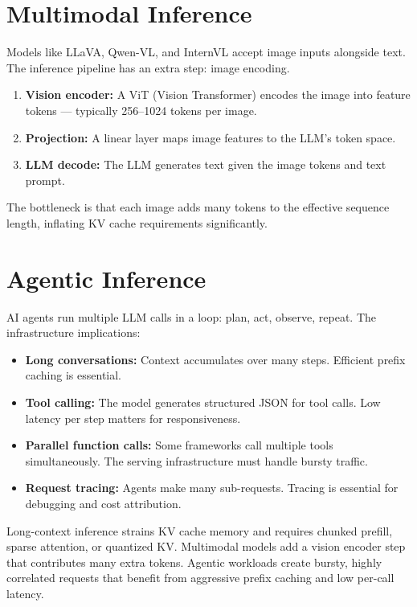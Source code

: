 \documentclass[11pt, twoside, openright]{book}
\newenvironment{chapsummary}
  {\begin{tcolorbox}[enhanced, breakable,
    colback={rgb,255:red,245;green,245;blue,225},
    colframe=AccentOrange, boxrule=1.5pt, arc=4pt,
    title={\bfseries Chapter Summary},
    fonttitle=\bfseries\color{white},
    attach boxed title to top left={yshift=-2mm, xshift=5mm},
    boxed title style={colback=AccentOrange, arc=2pt}]}
  {\end{tcolorbox}}
\begin{document}
\section{Multimodal Inference}

Models like LLaVA, Qwen-VL, and InternVL accept image inputs alongside text.
The inference pipeline has an extra step: image encoding.

\begin{enumerate}
  \item \textbf{Vision encoder:} A ViT (Vision Transformer) encodes the image
        into feature tokens --- typically 256--1024 tokens per image.
  \item \textbf{Projection:} A linear layer maps image features to the LLM's
        token space.
  \item \textbf{LLM decode:} The LLM generates text given the image tokens
        and text prompt.
\end{enumerate}

The bottleneck is that each image adds many tokens to the effective sequence
length, inflating KV cache requirements significantly.

\section{Agentic Inference}

AI agents run multiple LLM calls in a loop: plan, act, observe, repeat.
The infrastructure implications:

\begin{itemize}
  \item \textbf{Long conversations:} Context accumulates over many steps.
        Efficient prefix caching is essential.
  \item \textbf{Tool calling:} The model generates structured JSON for tool calls.
        Low latency per step matters for responsiveness.
  \item \textbf{Parallel function calls:} Some frameworks call multiple tools
        simultaneously.  The serving infrastructure must handle bursty traffic.
  \item \textbf{Request tracing:} Agents make many sub-requests.  Tracing is
        essential for debugging and cost attribution.
\end{itemize}

\begin{chapsummary}
Long-context inference strains KV cache memory and requires chunked prefill,
sparse attention, or quantized KV.  Multimodal models add a vision encoder step
that contributes many extra tokens.  Agentic workloads create bursty, highly
correlated requests that benefit from aggressive prefix caching and low per-call
latency.
\end{chapsummary}
\end{document}
